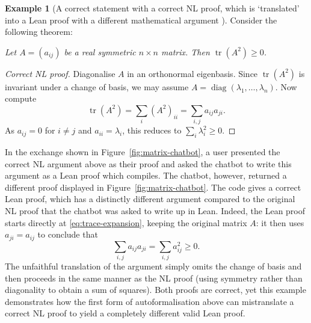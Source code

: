 \documentclass[10pt, a4paper, reqno]{amsart}
\numberwithin{equation}{section}
\renewcommand{\geq}{\geqslant}
\theoremstyle{definition}
\newtheorem{example}[theorem]{Example}
\theoremstyle{definition}
\begin{document}
\begin{example}[A correct statement with a correct NL proof, which is `translated' into a Lean proof with a different mathematical argument ]\label{ex:example2}
Consider the following theorem:


\vspace{2mm}
\begin{center}{\it 
Let \(A = (a_{ij})\) be a real symmetric \(n\times n\) matrix. Then \(\operatorname{tr}(A^2)\geq0\).
}
\end{center}


\begin{proof}[Correct NL proof]
Diagonalise $A$ in an orthonormal eigenbasis. Since
$\operatorname{tr}(A^2)$ is invariant under a change of basis, we may
assume $A=\operatorname{diag}(\lambda_1,\ldots,\lambda_n)$. Now compute
\begin{equation}\label{eq:trace-expansion}
    \operatorname{tr}(A^2)
    =\sum_i(A^2)_{ii}
    =\sum_{i,j}a_{ij}a_{ji}.
\end{equation}
As $a_{ij}=0$ for $i\ne j$ and $a_{ii}=\lambda_i$, this reduces to
$\sum_i\lambda_i^2\geq0$.
\end{proof}






In the exchange shown in Figure~\ref{fig:matrix-chatbot}, a user presented
the correct NL argument above as their proof and asked the chatbot to
write this argument as a Lean proof which compiles. The chatbot, however, returned a different proof displayed in Figure~\ref{fig:matrix-chatbot}. The code gives a correct Lean proof, which has a distinctly different argument compared to the original NL proof that the chatbot was asked to write up in Lean.  Indeed, the Lean proof starts directly at \eqref{eq:trace-expansion}, keeping the original matrix $A$: it then uses $a_{ji}=a_{ij}$ to conclude that
\[
    \sum_{i,j}a_{ij}a_{ji}=\sum_{i,j}a_{ij}^2\geq0.
\]
The unfaithful translation of the argument simply omits the change of basis and then proceeds in the same manner as the NL proof (using symmetry rather than diagonality to obtain a sum of squares). Both proofs are correct, yet this example demonstrates how the first form of autoformalisation above can mistranslate a correct NL proof to yield a completely different valid Lean proof.
\end{example}
\end{document}
